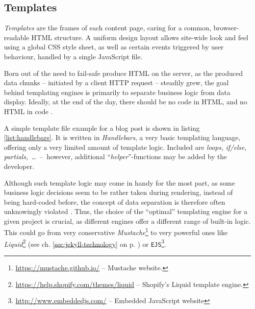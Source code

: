 \subsection{Templates}
\label{sec:buildpipelines-templates}

\emph{Templates} are the frames of each content page, caring for a common, browser-readable HTML structure. A uniform design layout allows site-wide look and feel using a global CSS style sheet, as well as certain events triggered by user behaviour, handled by a single JavaScript file.

Born out of the need to fail-safe produce HTML on the server, as the produced data chunks -- initiated by a client HTTP request -- steadily grew, the goal behind templating engines is primarily to separate business logic from data display. Ideally, at the end of the day, there should be no code in HTML, and no HTML in code \cite[225]{Parr2004templates}.



A simple template file example for a blog post is shown in listing \ref{list:handlebars}. It is written in \emph{Handlebars}, a very basic templating language, offering only a very limited amount of template logic. Included are \emph{loops, if/else, partials,~\ldots}~--~however, additional ``\emph{helper}''-functions may be added by the developer.

Although such template logic may come in handy for the most part, as some business logic decisions seem to be rather taken during rendering, instead of being hard-coded before, the concept of data separation is therefore often unknowingly violated \cite[228]{Parr2004templates}. Thus, the choice of the ``optimal'' templating engine for a given project is crucial, as different engines offer a different range of built-in logic. This could go from very conservative \emph{Mustache}\footnote{\url{https://mustache.github.io/} -- Mustache website.} to very powerful ones like \emph{Liquid}\footnote{\url{https://help.shopify.com/themes/liquid} -- Shopify's Liquid template engine.} (see ch. \ref{sec:jekyll-technology} on p. \pageref{sec:jekyll-technology}) or \texttt{EJS}\footnote{\url{http://www.embeddedjs.com/} -- Embedded JavaScript website}.
